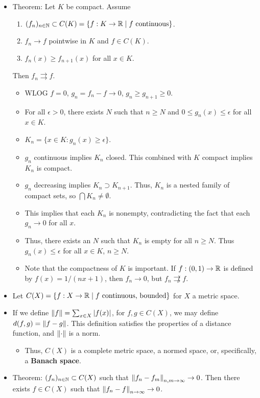 \documentclass[../../notes.tex]{subfiles}
\begin{document}
\begin{itemize}
    \item Theorem: Let $K$ be compact. Assume
    \begin{enumerate}[label={(\alph*)}]
        \item $(f_n)_{n\in\mathbb{N}}\subset C(K)=\{f:K\to\mathbb{R}\mid f\text{ continuous}\}$.
        \item $f_n\to f$ pointwise in $K$ and $f\in C(K)$.
        \item $f_n(x)\geq f_{n+1}(x)$ for all $x\in K$.
    \end{enumerate}
    Then $f_n\rightrightarrows f$.
    \begin{itemize}
        \item WLOG $f=0$, $g_n=f_n-f\to 0$, $g_n\geq g_{n+1}\geq 0$.
        \item For all $\epsilon>0$, there exists $N$ such that $n\geq N$ and $0\leq g_n(x)\leq\epsilon$ for all $x\in K$.
        \item $K_n=\{x\in K:g_n(x)\geq\epsilon\}$.
        \item $g_n$ continuous implies $K_n$ closed. This combined with $K$ compact implies $K_n$ is compact.
        \item $g_n$ decreasing implies $K_n\supset K_{n+1}$. Thus, $K_n$ is a nested family of compact sets, so $\bigcap K_n\neq\emptyset$.
        \item This implies that each $K_n$ is nonempty, contradicting the fact that each $g_n\to 0$ for all $x$.
        \item Thus, there exists an $N$ such that $K_n$ is empty for all $n\geq N$. Thus $g_n(x)\leq\epsilon$ for all $x\in K$, $n\geq N$.
        \item Note that the compactness of $K$ is important. If $f:(0,1)\to\mathbb{R}$ is defined by $f(x)=1/(nx+1)$, then $f_n\to 0$, but $f_n\not\rightrightarrows f$.
    \end{itemize}
    \item Let $C(X)=\{f:X\to\mathbb{R}\mid f\text{ continuous, bounded}\}$ for $X$ a metric space.
    \item If we define $\norm{f}=\sum_{x\in X}|f(x)|$, for $f,g\in C(X)$, we may define $d(f,g)=\norm{f-g}$. This definition satisfies the properties of a distance function, and $\norm{\cdot}$ is a norm.
    \begin{itemize}
        \item Thus, $C(X)$ is a complete metric space, a normed space, or, specifically, a \textbf{Banach space}.
    \end{itemize}
    \item Theorem: $(f_n)_{n\in\mathbb{N}}\subset C(X)$ such that $\norm{f_n-f_m}_{n,m\to\infty}\to 0$. Then there exists $f\in C(X)$ such that $\norm{f_n-f}_{n\to\infty}\to 0$.

\end{itemize}
\end{document}
